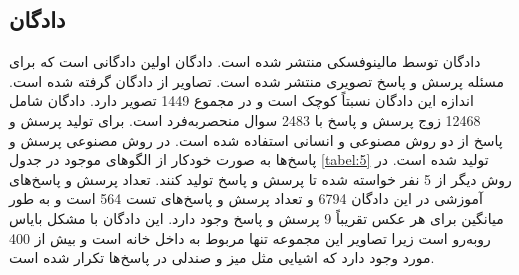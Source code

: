 \subsection{ دادگان }
	دادگان
	\cite{malinowski2014multi}
	توسط مالینوفسکی منتشر ‌شده ‌است. دادگان 
اولین دادگانی است که برای مسئله پرسش و پاسخ تصویری منتشر ‌شده ‌است. تصاویر از دادگان
  \cite{silberman2012indoor}
   گرفته ‌شده ‌است.  اندازه این دادگان نسبتاً کوچک است و در مجموع 1449 تصویر دارد. دادگان
 شامل 12468 زوج پرسش و پاسخ با 2483 سوال منحصربه‌فرد است. برای تولید پرسش و پاسخ‌ از دو روش مصنوعی و انسانی استفاده ‌شده ‌است. در روش مصنوعی پرسش و پاسخ‌ها به صورت خودکار از الگوهای موجود در جدول
 \ref{tabel:5}
  تولید ‌شده ‌است. در روش دیگر از 5 نفر خواسته ‌شده‌ تا پرسش و پاسخ تولید کنند. تعداد پرسش و پاسخ‌های آموزشی در این ‌دادگان 6794 و تعداد پرسش و پاسخ‌های تست 564 است و به طور میانگین برای هر عکس تقریباً 9 پرسش و پاسخ وجود دارد. این دادگان با مشکل بایاس 
  روبه‌رو است زیرا تصاویر این مجموعه تنها مربوط به داخل خانه است و بیش از 400 مورد وجود دارد که اشیایی مثل میز و صندلی در پاسخ‌ها تکرار شده ‌است.
